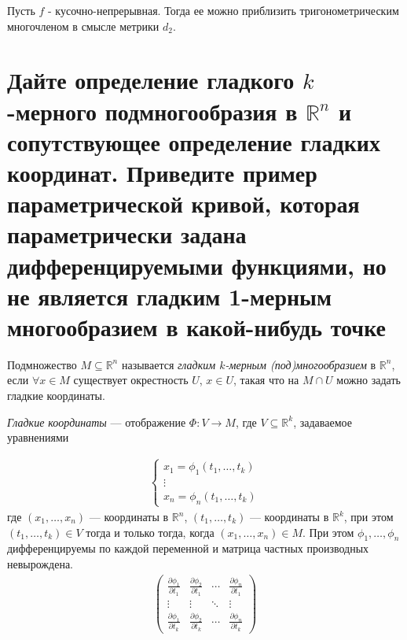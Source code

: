 \documentclass{article}
\begin{document}
	\begin{theorem} 
		Пусть $f$ - кусочно-непрерывная. Тогда ее можно приблизить тригонометрическим многочленом в смысле метрики $d_2$.
	\end{theorem}



	

	\setcounter{section}{13}

	\section{Дайте определение гладкого $k$-мерного подмногообразия в $\mathbb{R}^n$ и сопутствующее определение гладких координат. Приведите пример параметрической кривой, которая параметрически задана дифференцируемыми функциями, но не является гладким 1-мерным многообразием в какой-нибудь точке}
\begin{definition}
	Подмножество $M\subseteq \mathbb{R}^n$ называется \textit{гладким $k$-мерным (под)многообразием} в $\mathbb{R}^n$, если $\forall x \in M$ существует окрестность $U$, $x\in U$, такая что на $M \cap U$ можно задать гладкие координаты.
\end{definition}
\begin{definition}
\textit{Гладкие координаты} --- отображение $\Phi: V \xrightarrow{} M$, где $V \subseteq \mathbb{R}^k$, задаваемое уравнениями
\end{definition}
\begin{gather*}
\begin{cases}
    x_1 = \phi_1(t_1, \dotsc, t_k)\\
    \vdots\\
    x_n = \phi_n(t_1, \dotsc, t_k)
\end{cases}
\end{gather*}
где $(x_1, \dotsc, x_n)$ --- координаты в $\mathbb{R}^n$, $(t_1, \dotsc, t_k)$ --- координаты в $\mathbb{R}^k$,
при этом $(t_1, \dotsc, t_k) \in V$ тогда и только тогда, когда $(x_1, \dotsc, x_n)\in M$. При этом $\phi_1,\dotsc,\phi_n$ дифференцируемы по каждой переменной и матрица частных производных невырождена.
\begin{gather*}
\begin{pmatrix}
\frac{\partial \phi_1}{\partial t_1} & \frac{\partial \phi_2}{\partial t_1} & \cdots & \frac{\partial \phi_n}{\partial t_1} \\
\vdots & \vdots & \ddots & \vdots \\
\frac{\partial \phi_1}{\partial t_k} & \frac{\partial \phi_2}{\partial t_k} & \cdots & \frac{\partial \phi_n}{\partial t_k}
\end{pmatrix}
\end{gather*}
\end{document}
